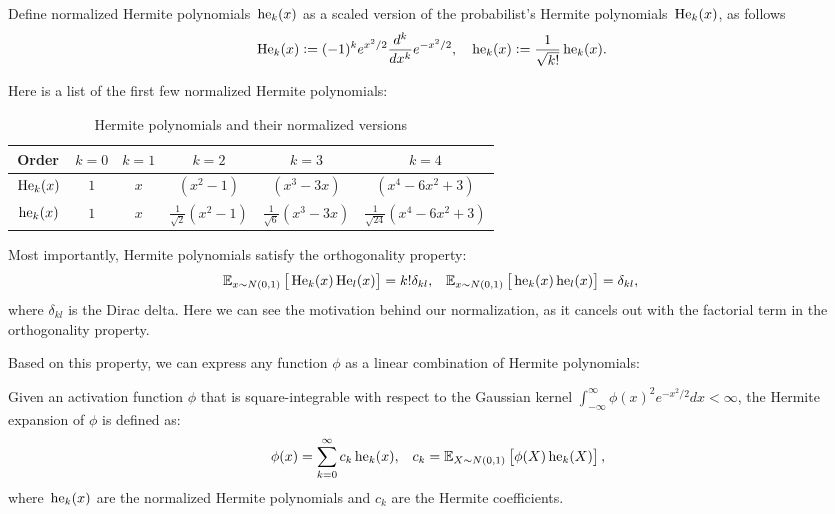\begin{definition}
Define normalized Hermite polynomials $\,\mathrm{he}_k(x)$ as a scaled version of the probabilist's Hermite polynomials $\,\mathrm{He}_k(x)$, as follows
\begin{align*}
&\,\mathrm{He}_k(x) :=(-1)^k e^{x^2/2} \frac{d^k}{dx^k} e^{-x^2/2}, && \,\mathrm{he}_k(x):=\frac{1}{\sqrt{k!}} \,\mathrm{he}_k(x).
\end{align*}
\end{definition}

Here is a list of the first few normalized Hermite polynomials:

\begin{table}[ht]
    \centering
    \caption{Hermite polynomials and their normalized versions}
    \begin{tabular}{|c|c|c|c|c|c|}
    \hline
 Order & $k=0$ & $k=1$ & $k=2$ & $k=3$ & $k=4$ \\
 \hline
 $\,\mathrm{He}_k(x)$ & $1$ & $x$ & $ (x^2 - 1)$ & $(x^3 - 3x)$ & $(x^4 - 6x^2 + 3)$ \\    
 \hline
 $\,\mathrm{he}_k(x)$ & $1$ & $x$ & $\frac{1}{\sqrt{2}} (x^2 - 1)$ & $\frac{1}{\sqrt{6}} (x^3 - 3x)$ & $\frac{1}{\sqrt{24}} (x^4 - 6x^2 + 3)$ \\
    \hline
    \end{tabular}
\end{table}

Most importantly, Hermite polynomials satisfy the orthogonality property:
\begin{align}\label{iso:eq:hermite_orthogonality}
    &\mathbb{E}_{x\sim N(0,1)} \left[\,\mathrm{He}_k(x)\,\mathrm{He}_l(x)\right] = k! \delta_{kl}, &&\mathbb{E}_{x\sim N(0,1)} \left[\,\mathrm{he}_k(x)\,\mathrm{he}_l(x)\right] = \delta_{kl},
\end{align}
where $\delta_{kl}$ is the Dirac delta. Here we can see the motivation behind our normalization, as it cancels out with the factorial term in the orthogonality property. 

Based on this property, we can express any function $\phi$ as a linear combination of Hermite polynomials:

\begin{definition}\label{iso:def:hermite_expansion}
Given an activation function $\phi$ that is square-integrable with respect to the Gaussian kernel $\int_{-\infty}^\infty \phi(x)^2 e^{-x^2/2}dx < \infty$, the Hermite expansion of $\phi$ is defined as:
\begin{align*}
\phi(x) = \sum_{k=0}^\infty c_k \,\mathrm{he}_k(x),&&c_k = \mathbb{E}_{X\sim N(0,1)} \left[\phi(X) \,\mathrm{he}_k(X)\right],
\end{align*}
where $\,\mathrm{he}_k(x)$ are the normalized Hermite polynomials and $c_k$ are the Hermite coefficients. 
\end{definition}

